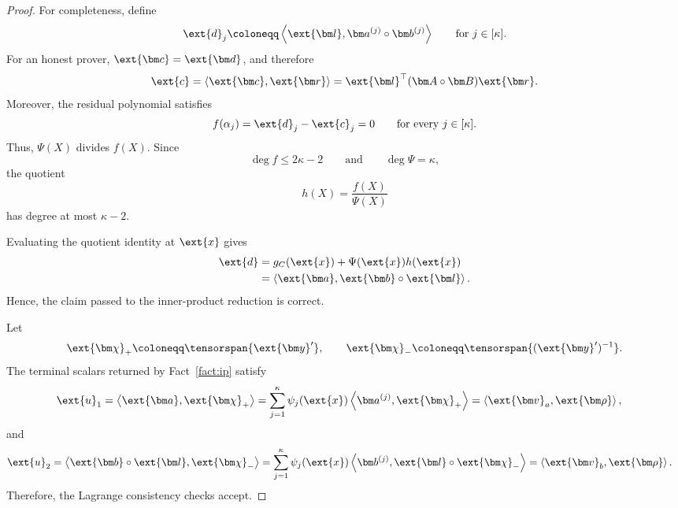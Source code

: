 \begin{proof}
For completeness, define
\[
    \ext{d}_j
    \coloneqq
    \left\langle
        \ext{\bm l},
        \bm a^{(j)}\circ\bm b^{(j)}
    \right\rangle
    \qquad
    \text{for }j\in[\kappa].
\]
For an honest prover,
\(\ext{\bm c}=\ext{\bm d}\), and therefore
\[
    \ext{c}
    =
    \left\langle
        \ext{\bm c},\ext{\bm r}
    \right\rangle
    =
    \ext{\bm l}^{\top}
    (\bm A\circ\bm B)
    \ext{\bm r}.
\]
Moreover, the residual polynomial satisfies
\[
    f(\alpha_j)
    =
    \ext{d}_j-\ext{c}_j
    =
    0
    \qquad
    \text{for every }j\in[\kappa].
\]
Thus, \(\Psi(X)\) divides \(f(X)\). Since
\[
    \deg f\leq2\kappa-2
    \qquad\text{and}\qquad
    \deg\Psi=\kappa,
\]
the quotient
\[
    h(X)=\frac{f(X)}{\Psi(X)}
\]
has degree at most \(\kappa-2\).

Evaluating the quotient identity at \(\ext{x}\) gives
\[
\begin{aligned}
    \ext{d}
    &=
    g_C(\ext{x})
    +
    \Psi(\ext{x})h(\ext{x})\\
    &=
    \left\langle
        \ext{\bm a},
        \ext{\bm b}\circ\ext{\bm l}
    \right\rangle.
\end{aligned}
\]
Hence, the claim passed to the inner-product reduction is correct.

Let
\[
    \ext{\bm\chi}_+
    \coloneqq
    \tensorspan{\ext{\bm y}'},
    \qquad
    \ext{\bm\chi}_-
    \coloneqq
    \tensorspan{(\ext{\bm y}')^{-1}}.
\]
The terminal scalars returned by Fact~\ref{fact:ip} satisfy
\[
\begin{aligned}
    \ext{u}_1
    &=
    \left\langle
        \ext{\bm a},\ext{\bm\chi}_+
    \right\rangle=
    \sum_{j=1}^{\kappa}
    \psi_j(\ext{x})
    \left\langle
        \bm a^{(j)},\ext{\bm\chi}_+
    \right\rangle
    =
    \left\langle
        \ext{\bm v}_a,\ext{\bm\rho}
    \right\rangle,
\end{aligned}
\]
and
\[
\begin{aligned}
    \ext{u}_2
    &=
    \left\langle
        \ext{\bm b}\circ\ext{\bm l},
        \ext{\bm\chi}_-
    \right\rangle
    =
    \sum_{j=1}^{\kappa}
    \psi_j(\ext{x})
    \left\langle
        \bm b^{(j)},
        \ext{\bm l}\circ\ext{\bm\chi}_-
    \right\rangle
    =
    \left\langle
        \ext{\bm v}_b,\ext{\bm\rho}
    \right\rangle.
\end{aligned}
\]
Therefore, the Lagrange consistency checks accept.


\end{proof}
